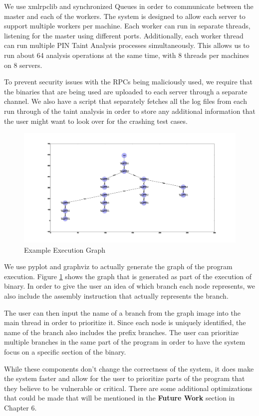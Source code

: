 We use xmlrpclib and synchronized Queues in order to communicate between the
master and each of the workers. The system is designed to allow each server to
support multiple workers per machine. Each worker can run in separate threads,
listening for the master using different ports. Additionally, each worker thread
can run multiple PIN Taint Analysis processes simultaneously. This allows us to
run about 64 analysis operations at the same time, with 8 threads per machines
on 8 servers.

To prevent security issues with the RPCs being maliciously used, we require that
the binaries that are being used are uploaded to each server through a separate
channel. We also have a script that separately fetches all the log files from
each run through of the taint analysis in order to store any additional
information that the user might want to look over for the crashing test cases.

\begin{figure}[t]
 \centering
 \includegraphics[width=\textwidth]{graphs/1_7}
 \caption{Example Execution Graph}
 \label{figure:samplegraph}
\end{figure}

We use pyplot and graphviz to actually generate the graph of the program
execution. Figure \ref{figure:samplegraph} shows the graph that is generated as
part of the execution of binary. In order to give the user an idea of which
branch each node represents, we also include the assembly instruction that
actually represents the branch.

The user can then input the name of a branch from the graph image into the main
thread in order to prioritize it. Since each node is uniquely identified,
the name of the branch also includes the prefix branches. The user can
prioritize multiple branches in the same part of the program in order to have
the system focus on a specific section of the binary.

While these components don't change the correctness of the system, it does make
the system faster and allow for the user to prioritize parts of the program that
they believe to be vulnerable or critical. There are some additional
optimizations that could be made that will be mentioned in the \textbf{Future
  Work} section in Chapter 6.